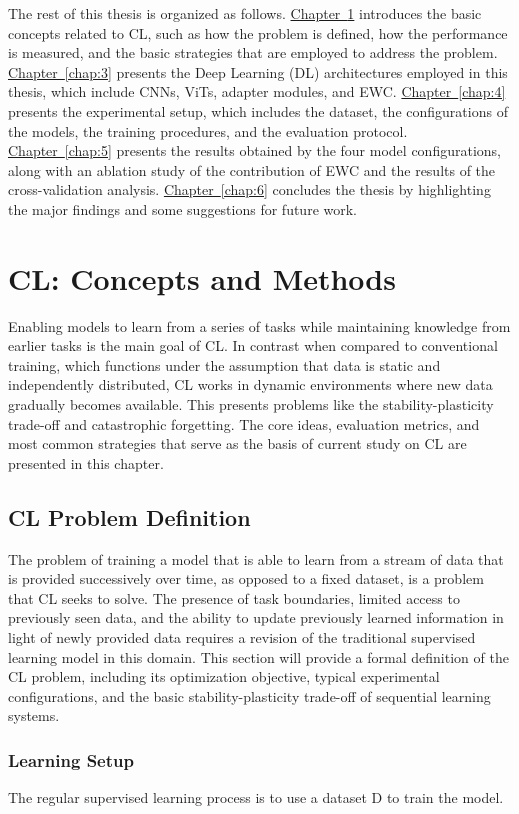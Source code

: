 \documentclass[english, LaM, oneside]{sapthesis}%
\numberwithin{equation}{chapter}
\begin{document}
The rest of this thesis is organized as follows. \hyperref[chap:2]{Chapter~\ref*{chap:2}} introduces the basic concepts related to CL, such as how the problem is defined, how the performance is measured, and the basic strategies that are employed to address the problem. \hyperref[chap:3]{Chapter~\ref*{chap:3}} presents the Deep Learning (DL) architectures employed in this thesis, which include CNNs, ViTs, adapter modules, and EWC. \hyperref[chap:4]{Chapter~\ref*{chap:4}} presents the experimental setup, which includes the dataset, the configurations of the models, the training procedures, and the evaluation protocol. \hyperref[chap:5]{Chapter~\ref*{chap:5}} presents the results obtained by the four model configurations, along with an ablation study of the contribution of EWC and the results of the cross-validation analysis. \hyperref[chap:6]{Chapter~\ref*{chap:6}} concludes the thesis by highlighting the major findings and some suggestions for future work.
\chapter{CL: Concepts and Methods}
\label{chap:2}
Enabling models to learn from a series of tasks while maintaining knowledge from earlier tasks is the main goal of CL. In contrast when compared to conventional training, which functions under the assumption that data is static and independently distributed, CL works in dynamic environments where new data gradually becomes available. This presents problems like the stability-plasticity trade-off and catastrophic forgetting. The core ideas, evaluation metrics, and most common strategies that serve as the basis of current study on CL are presented in this chapter.
\section{CL Problem Definition}
The problem of training a model that is able to learn from a stream of data that is provided successively over time, as opposed to a fixed dataset, is a problem that CL seeks to solve\cite{6}. The presence of task boundaries, limited access to previously seen data, and the ability to update previously learned information in light of newly provided data requires a revision of the traditional supervised learning model in this domain. This section will provide a formal definition of the CL problem, including its optimization objective, typical experimental configurations, and the basic stability-plasticity trade-off of sequential learning systems.
\subsection{Learning Setup}
The regular supervised learning process is to use a dataset D to train the model.
\end{document}

